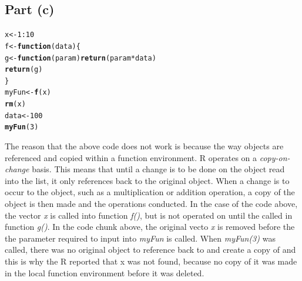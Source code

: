 \documentclass{article}\usepackage[]{graphicx}\usepackage[]{color}
\makeatletter
\newcommand{\hlnum}[1]{\textcolor[rgb]{0.686,0.059,0.569}{#1}}%
\newcommand{\hlopt}[1]{\textcolor[rgb]{0,0,0}{#1}}%
\newcommand{\hlstd}[1]{\textcolor[rgb]{0.345,0.345,0.345}{#1}}%
\newcommand{\hlkwa}[1]{\textcolor[rgb]{0.161,0.373,0.58}{\textbf{#1}}}%
\newcommand{\hlkwb}[1]{\textcolor[rgb]{0.69,0.353,0.396}{#1}}%
\newcommand{\hlkwc}[1]{\textcolor[rgb]{0.333,0.667,0.333}{#1}}%
\newcommand{\hlkwd}[1]{\textcolor[rgb]{0.737,0.353,0.396}{\textbf{#1}}}%
\newenvironment{kframe}{%
 \def\at@end@of@kframe{}%
 \ifinner\ifhmode%
  \def\at@end@of@kframe{\end{minipage}}%
  \begin{minipage}{\columnwidth}%
 \fi\fi%
 \def\FrameCommand##1{\hskip\@totalleftmargin \hskip-\fboxsep
 \colorbox{shadecolor}{##1}\hskip-\fboxsep
     \hskip-\linewidth \hskip-\@totalleftmargin \hskip\columnwidth}%
 \MakeFramed {\advance\hsize-\width
   \@totalleftmargin\z@ \linewidth\hsize
   \@setminipage}}%
 {\par\unskip\endMakeFramed%
 \at@end@of@kframe}
\newenvironment{knitrout}{}{} %
\makeatother
\begin{document}
\subsection{Part (c)}
\begin{knitrout}
\color{fgcolor}\begin{kframe}
\begin{alltt}
\hlstd{x}  \hlkwb{<-} \hlnum{1}\hlopt{:}\hlnum{10}
\hlstd{f} \hlkwb{<-} \hlkwa{function}\hlstd{(}\hlkwc{data}\hlstd{) \{}
  \hlstd{g} \hlkwb{<-} \hlkwa{function}\hlstd{(}\hlkwc{param}\hlstd{)} \hlkwd{return}\hlstd{(param} \hlopt{*} \hlstd{data)}
  \hlkwd{return}\hlstd{(g)}
\hlstd{\}}
\hlstd{myFun} \hlkwb{<-} \hlkwd{f}\hlstd{(x)}
\hlkwd{rm}\hlstd{(x)}
\hlstd{data} \hlkwb{<-} \hlnum{100}
\hlkwd{myFun}\hlstd{(}\hlnum{3}\hlstd{)}
\end{alltt}


{\ttfamily\noindent\bfseries\color{errorcolor}{\#\# Error in myFun(3): object 'x' not found}}\end{kframe}
\end{knitrout}
The reason that the above code does not work is because the way objects are referenced and copied within a function environment.  R operates on a \emph{copy-on-change} basis.  This means that until a change is to be done on the object read into the list, it only references back to the original object.  When a change is to occur to the object, such as a multiplication or addition operation, a copy of the object is then made and the operations conducted.  In the case of the code above, the vector \emph{x} is called into function \emph{f()}, but is not operated on until the called in function \emph{g()}.  In the code chunk above, the original vecto \emph{x} is removed before the the parameter required to input into \emph{myFun} is called.  When \emph{myFun(3)} was called, there was no original object to reference back to and create a copy of and this is why the R reported that x was not found, because no copy of it was made in the local function environment before it was deleted.
\end{document}
